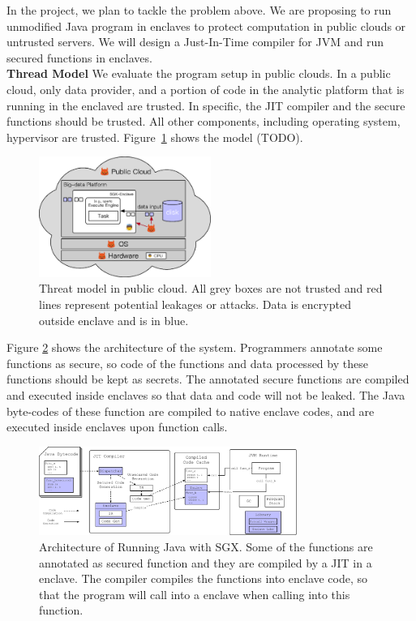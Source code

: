 In the project, we plan to tackle the problem above. We are proposing to
run unmodified Java program in enclaves to protect computation in public
clouds or untrusted servers. We will design a Just-In-Time compiler for JVM
and run secured functions in enclaves.\\
\textbf{Thread Model} We evaluate the program setup in public clouds.
In a public cloud, only data provider, and a portion of code
in the analytic platform
that is running in the enclaved are trusted. In specific, the JIT compiler and
the secure functions should be trusted.
All other components, including operating system,
hypervisor are trusted. Figure~\ref{fig:threat_public} shows the model (TODO).
\begin{figure}[!h]
  \center
  \footnotesize
  \includegraphics[width=0.5\textwidth]{figures/threat_public.ps}
  \caption{\footnotesize{Threat model in public cloud. All grey boxes are not 
trusted and red lines
  represent potential leakages or attacks. Data is encrypted outside enclave and 
is in blue.}}
  \label{fig:threat_public}
\end{figure}

Figure \ref{arch} shows the architecture
of the system. Programmers annotate some functions as secure, so code of the 
functions
and data processed by these functions should be kept as secrets.
The annotated secure functions are compiled and executed inside
enclaves so that data and code will not be leaked.
The Java byte-codes of these function are compiled to native enclave
codes, and are executed inside enclaves upon function calls.

\begin{figure}[tbh]
  \center
  \includegraphics[width=0.75\textwidth]{figures/jit_arch.ps}
  \caption{Architecture of Running Java with SGX. Some of the functions are
  annotated as secured function and they are compiled by a JIT in a enclave.
  The compiler compiles the functions into enclave code, so that the program 
will
  call into a enclave when calling into this function.}
  \label{arch}
\end{figure}

